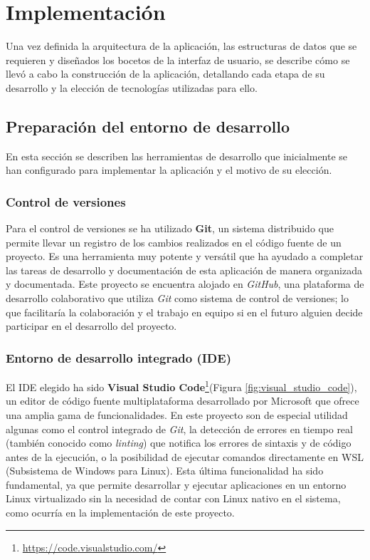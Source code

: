 \chapter{Implementación}

Una vez definida la arquitectura de la aplicación, las estructuras de datos que se requieren y diseñados los bocetos de la interfaz de usuario, se describe cómo se llevó a cabo la construcción de la aplicación, detallando cada etapa de su desarrollo y la elección de tecnologías utilizadas para ello.

\section{Preparación del entorno de desarrollo}
En esta sección se describen las herramientas de desarrollo que inicialmente se han configurado para implementar la aplicación y el motivo de su elección.

\subsection{Control de versiones}
Para el control de versiones se ha utilizado \textbf{Git}, un sistema distribuido que permite llevar un registro de los cambios realizados en el código fuente de un proyecto. Es una herramienta muy potente y versátil que ha ayudado a completar las tareas de desarrollo y documentación de esta aplicación de manera organizada y documentada. Este proyecto se encuentra alojado en \textit{GitHub}, una plataforma de desarrollo colaborativo que utiliza \textit{Git} como sistema de control de versiones; lo que facilitaría la colaboración y el trabajo en equipo si en el futuro alguien decide participar en el desarrollo del proyecto.

\subsection{Entorno de desarrollo integrado (IDE)}
El IDE elegido ha sido \textbf{Visual Studio Code}\footnote{\url{https://code.visualstudio.com/}}(Figura \ref{fig:visual_studio_code}), un editor de código fuente multiplataforma desarrollado por Microsoft que ofrece una amplia gama de funcionalidades. En este proyecto son de especial utilidad algunas como el control integrado de \textit{Git}, la detección de errores en tiempo real (también conocido como \textit{linting}) que notifica los errores de sintaxis y de código antes de la ejecución, o la posibilidad de ejecutar comandos directamente en WSL (Subsistema de Windows para Linux). Esta última funcionalidad ha sido fundamental, ya que permite desarrollar y ejecutar aplicaciones en un entorno Linux virtualizado sin la necesidad de contar con Linux nativo en el sistema, como ocurría en la implementación de este proyecto.

